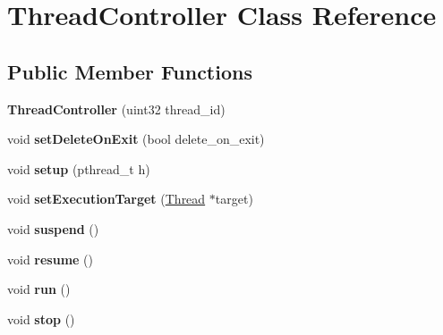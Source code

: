 \hypertarget{classThreadController}{\section{\-Thread\-Controller \-Class \-Reference}
\label{classThreadController}
}
\subsection*{\-Public \-Member \-Functions}
\begin{DoxyCompactItemize}
\item 
\hypertarget{classThreadController_a5630063d3823feb63568f54eb3b09141}{{\bfseries \-Thread\-Controller} (uint32 thread\-\_\-id)}\label{classThreadController_a5630063d3823feb63568f54eb3b09141}

\item 
\hypertarget{classThreadController_abcb1eeeade9465f8b9d288ce05a35b90}{void {\bfseries set\-Delete\-On\-Exit} (bool delete\-\_\-on\-\_\-exit)}\label{classThreadController_abcb1eeeade9465f8b9d288ce05a35b90}

\item 
\hypertarget{classThreadController_a9cd2328f7af385c70a37a5f07d449bdb}{void {\bfseries setup} (pthread\-\_\-t h)}\label{classThreadController_a9cd2328f7af385c70a37a5f07d449bdb}

\item 
\hypertarget{classThreadController_a0c1ccf8af0171905931023efbf45ea5c}{void {\bfseries set\-Execution\-Target} (\hyperlink{classThread}{\-Thread} $\ast$target)}\label{classThreadController_a0c1ccf8af0171905931023efbf45ea5c}

\item 
\hypertarget{classThreadController_a78662807f4c0bf1714f2aeefe6205ced}{void {\bfseries suspend} ()}\label{classThreadController_a78662807f4c0bf1714f2aeefe6205ced}

\item 
\hypertarget{classThreadController_a53489422689e5ddcffde97d5c726154a}{void {\bfseries resume} ()}\label{classThreadController_a53489422689e5ddcffde97d5c726154a}

\item 
\hypertarget{classThreadController_a74a5e83564dcde1144f6c2d9394bd6ab}{void {\bfseries run} ()}\label{classThreadController_a74a5e83564dcde1144f6c2d9394bd6ab}

\item 
\hypertarget{classThreadController_ad150063920776421824399b975996117}{void {\bfseries stop} ()}\label{classThreadController_ad150063920776421824399b975996117}


\end{DoxyCompactItemize}
